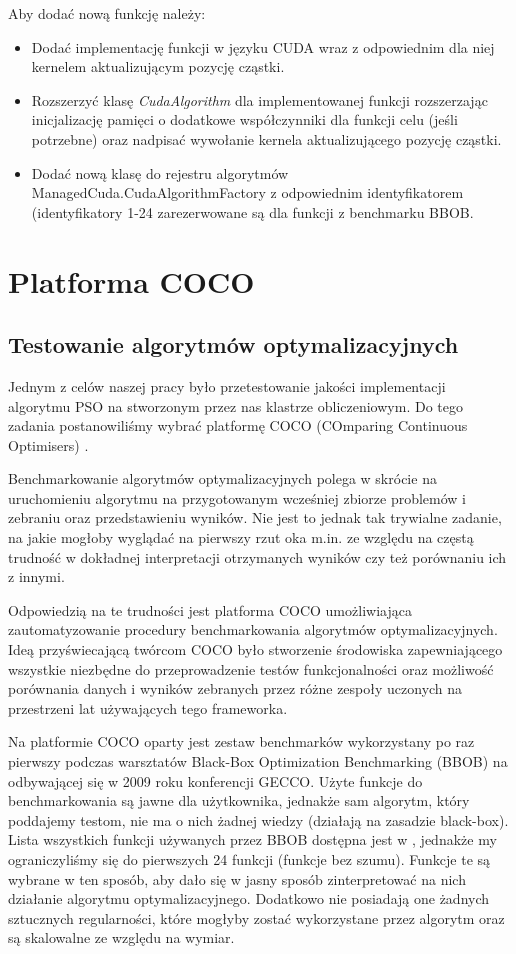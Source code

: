 \documentclass[12pt, twoside, openany, abstract=on]{report}
\theoremstyle{definition}
\begin{document}
Aby dodać nową funkcję należy:
\begin{itemize}
\item Dodać implementację funkcji w języku CUDA wraz z odpowiednim dla niej kernelem aktualizującym pozycję cząstki.
\item Rozszerzyć klasę \textit{CudaAlgorithm} dla implementowanej funkcji rozszerzając inicjalizację pamięci o dodatkowe współczynniki dla funkcji celu (jeśli potrzebne) oraz nadpisać wywołanie kernela aktualizującego pozycję cząstki.
\item Dodać nową klasę do rejestru algorytmów ManagedCuda.CudaAlgorithmFactory z odpowiednim identyfikatorem (identyfikatory 1-24 zarezerwowane są dla funkcji z benchmarku BBOB.
\end{itemize}
 
 
\chapter{Platforma COCO}

\section{Testowanie algorytmów optymalizacyjnych}
Jednym z celów naszej pracy było przetestowanie jakości implementacji algorytmu PSO na stworzonym przez nas klastrze obliczeniowym. Do tego zadania postanowiliśmy wybrać platformę COCO (COmparing Continuous Optimisers) \cite{Coco}.

Benchmarkowanie algorytmów optymalizacyjnych polega w skrócie na uruchomieniu algorytmu na przygotowanym wcześniej zbiorze problemów i zebraniu oraz przedstawieniu wyników. Nie jest to jednak tak trywialne zadanie, na jakie mogłoby wyglądać na pierwszy rzut oka m.in. ze względu na częstą trudność w dokładnej interpretacji otrzymanych wyników czy też porównaniu ich z innymi.

Odpowiedzią na te trudności jest platforma COCO umożliwiająca zautomatyzowanie procedury benchmarkowania algorytmów optymalizacyjnych. Ideą przyświecającą twórcom COCO było stworzenie środowiska zapewniającego wszystkie niezbędne do przeprowadzenie testów funkcjonalności oraz możliwość porównania danych i wyników zebranych przez różne zespoły uczonych na przestrzeni lat używających tego frameworka. 


Na platformie COCO oparty jest zestaw benchmarków wykorzystany po raz pierwszy podczas warsztatów Black-Box Optimization Benchmarking (BBOB) na odbywającej się w 2009 roku konferencji GECCO.
Użyte funkcje do benchmarkowania są jawne dla użytkownika, jednakże sam algorytm, który poddajemy testom, nie ma o nich żadnej wiedzy (działają na zasadzie black-box). Lista wszystkich funkcji używanych przez BBOB dostępna jest w \cite{Coco}, jednakże my ograniczyliśmy się do pierwszych 24 funkcji (funkcje bez szumu).
Funkcje te są wybrane w ten sposób, aby dało się w jasny sposób zinterpretować na nich działanie algorytmu optymalizacyjnego. Dodatkowo nie posiadają one żadnych sztucznych regularności, które mogłyby zostać wykorzystane przez algorytm oraz są skalowalne ze względu na wymiar.
\end{document}
